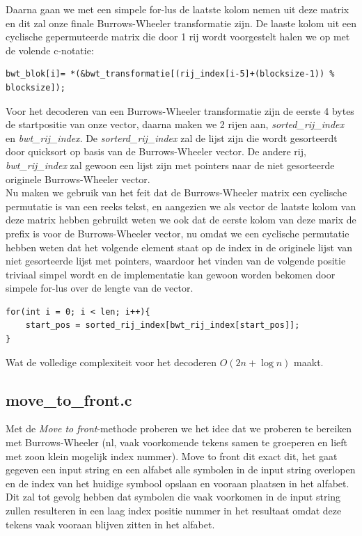\documentclass[10pt,a4paper]{report}
\begin{document}
Daarna gaan we met een simpele for-lus de laatste kolom nemen uit deze matrix en dit zal onze finale Burrows-Wheeler transformatie zijn. De laaste kolom uit een cyclische gepermuteerde matrix die door 1 rij wordt voorgestelt halen we op met de volende c-notatie:
\begin{lstlisting}
bwt_blok[i]= *(&bwt_transformatie[(rij_index[i-5]+(blocksize-1)) % blocksize]);
\end{lstlisting}
Voor het decoderen van een Burrows-Wheeler transformatie zijn de eerste 4 bytes de startpositie van onze vector, daarna maken we 2 rijen aan, \emph{sorted\_rij\_index} en \emph{bwt\_rij\_index}. De \emph{sorterd\_rij\_index} zal de lijst zijn die wordt gesorteerdt door quicksort op basis van de Burrows-Wheeler vector. De andere rij, \emph{bwt\_rij\_index} zal gewoon een lijst zijn met pointers naar de niet gesorteerde originele Burrows-Wheeler vector. \\

Nu maken we gebruik van het feit dat de Burrows-Wheeler matrix een cyclische permutatie is van een reeks tekst, en aangezien we als vector de laatste kolom van deze matrix hebben gebruikt weten we ook dat de eerste kolom van deze marix de prefix is voor de Burrows-Wheeler vector, nu omdat we een cyclische permutatie hebben weten dat het volgende element staat op de index in de originele lijst van niet gesorteerde lijst met pointers, waardoor het vinden van de volgende positie triviaal simpel wordt en de implementatie kan gewoon worden bekomen door simpele for-lus over de lengte van de vector.
\begin{lstlisting}
for(int i = 0; i < len; i++){
	start_pos = sorted_rij_index[bwt_rij_index[start_pos]];
}
\end{lstlisting}
Wat de volledige complexiteit voor het decoderen $O(2n + \log n)$ maakt.
\subsection*{move\_to\_front.c}
Met de \emph{Move to front}-methode proberen we het idee dat we proberen te bereiken met Burrows-Wheeler (nl, vaak voorkomende tekens samen te groeperen en lieft met zoon klein mogelijk index nummer). Move to front dit exact dit, het gaat gegeven een input string en een alfabet alle symbolen in de input string overlopen en de index van het huidige symbool opslaan en vooraan plaatsen in het alfabet. Dit zal tot gevolg hebben dat symbolen die vaak voorkomen in de input string zullen resulteren in een laag index positie nummer in het resultaat omdat deze tekens vaak vooraan blijven zitten in het alfabet.\\
\end{document}
